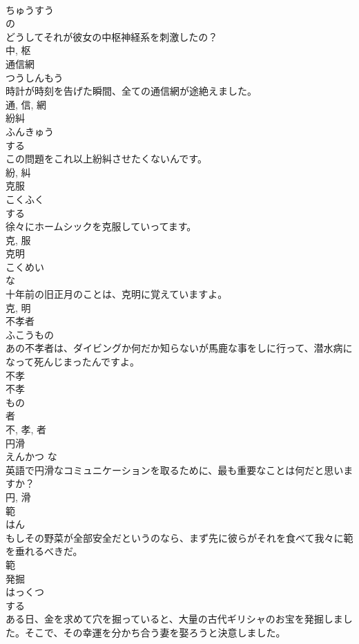 \documentclass[8pt]{extreport}
\begin{document}
\begin{CJK}{UTF8}{min}
\\	ちゅうすう	
\\	の 
\\	どうしてそれが彼女の中枢神経系を刺激したの？	
\\	中, 枢	
\\	通信網	
\\	つうしんもう	
\\	時計が時刻を告げた瞬間、全ての通信網が途絶えました。	
\\	通, 信, 網	
\\	紛糾	
\\	ふんきゅう	
\\	する 
\\	この問題をこれ以上紛糾させたくないんです。	
\\	紛, 糾	
\\	克服	
\\	こくふく	
\\	する 
\\	徐々にホームシックを克服していってます。	
\\	克, 服	
\\	克明	
\\	こくめい	
\\	な 
\\	十年前の旧正月のことは、克明に覚えていますよ。	
\\	克, 明	
\\	不孝者	
\\	ふこうもの	
\\	あの不孝者は、ダイビングか何だか知らないが馬鹿な事をしに行って、潜水病になって死んじまったんですよ。	
\\	不孝 
\\	不孝 
\\	もの 
\\	者 
\\	不, 孝, 者	
\\	円滑	
\\	えんかつ	な 
\\	英語で円滑なコミュニケーションを取るために、最も重要なことは何だと思いますか？	
\\	円, 滑	
\\	範	
\\	はん	
\\	もしその野菜が全部安全だというのなら、まず先に彼らがそれを食べて我々に範を垂れるべきだ。	
\\	範	
\\	発掘	
\\	はっくつ	
\\	する 
\\	ある日、金を求めて穴を掘っていると、大量の古代ギリシャのお宝を発掘しました。そこで、その幸運を分かち合う妻を娶ろうと決意しました。	

\end{CJK}
\end{document}
